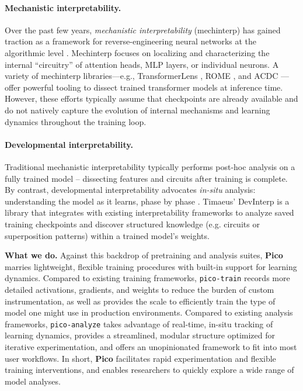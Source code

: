 \paragraph{Mechanistic interpretability.} Over the past few years, \emph{mechanistic interpretability} (mechinterp) has gained traction as a framework for reverse-engineering neural networks at the algorithmic level \cite{olah2020zoom, elhage2021mathematical}. Mechinterp focuses on localizing and characterizing the internal “circuitry” of attention heads, MLP layers, or individual neurons. A variety of mechinterp libraries—e.g., TransformerLens \cite{nanda2022transformerlens}, ROME \cite{meng2022locating}, and ACDC \cite{conmy2023towards}—offer powerful tooling to dissect trained transformer models at inference time. However, these efforts typically assume that checkpoints are already available and do not natively capture the evolution of internal mechanisms and learning dynamics throughout the training loop.

\vspace{-0.2cm}
\paragraph{Developmental interpretability.} Traditional mechanistic interpretability typically performs post-hoc analysis on a fully trained model – dissecting features and circuits after training is complete. By contrast, developmental interpretability advocates \textit{in-situ} analysis: understanding the model as it learns, phase by phase \cite{hoogland2023towards,devinterpcode, hoogland2025losslandscape}. Timaeus' DevInterp \cite{devinterpcode} is a library that integrates with existing interpretability frameworks to analyze saved training checkpoints and discover structured knowledge (e.g. circuits or superposition patterns) within a trained model’s weights. 

\textbf{What we do.} Against this backdrop of pretraining and analysis suites, \textbf{Pico} marries lightweight, flexible training procedures with built-in support for learning dynamics. Compared to existing training frameworks, \texttt{pico-train} records more detailed activations, gradients, and weights to reduce the burden of custom instrumentation, as well as provides the scale to efficiently train the type of model one might use in production environments. Compared to existing analysis frameworks, \texttt{pico-analyze} takes advantage of real-time, in-situ tracking of learning dynamics, provides a streamlined, modular structure optimized for iterative experimentation, and offers an unopinionated framework to fit into most user workflows. In short, \textbf{Pico} facilitates rapid experimentation and flexible training interventions, and enables researchers to quickly explore a wide range of model analyses.%

